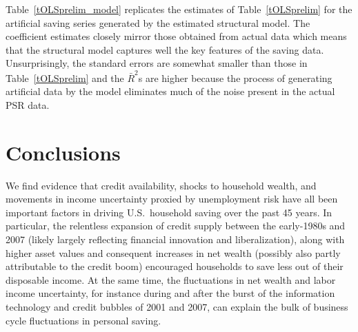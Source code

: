 \documentclass[titlepage]{\econtex}
\begin{document}
Table~\ref{tOLSprelim_model} replicates the estimates of Table~\ref{tOLSprelim} for the artificial saving series generated by the estimated structural model. The coefficient estimates closely mirror those obtained from actual data which means that the structural model captures well the key features of the saving data. Unsurprisingly, the standard errors are somewhat smaller than those in Table~\ref{tOLSprelim} and the $\bar{R}^2$s are higher because the process of generating artificial data by the model eliminates much of the noise present in the actual PSR data.



\section{Conclusions}

We find evidence that credit availability, shocks to household wealth, and movements in income uncertainty proxied by unemployment risk have all been important factors in driving U.S.\ household saving over the past 45 years. In particular, the relentless expansion of credit supply between the early-1980s and 2007 (likely largely reflecting financial innovation and liberalization), along with higher asset values and consequent increases in net wealth (possibly also partly attributable to the credit boom) encouraged households to save less out of their disposable income. At the same time, the fluctuations in net wealth and labor income uncertainty, for instance during and after the burst of the information technology and credit bubbles of 2001 and 2007, can explain the bulk of business cycle fluctuations in personal saving.
\end{document}
